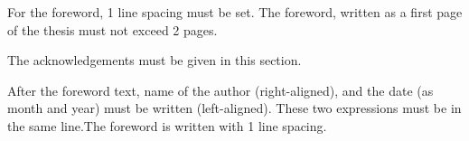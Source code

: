 For the foreword, 1 line spacing must be set. The foreword, written as a first page of the thesis must not exceed 2 pages. 

The acknowledgements must be given in this section. 

After the foreword text, name of the author (right-aligned), and the date (as month and year) must be written (left-aligned). These two expressions must be in the same line.The foreword is written with 1 line spacing. 
